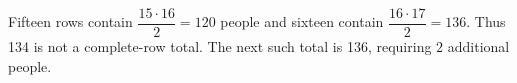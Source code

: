 Fifteen rows contain $\dfrac{15\cdot16}{2}=120$ people and sixteen contain $\dfrac{16\cdot17}{2}=136$. Thus 134 is not a complete-row total. The next such total is 136, requiring $\boxed2$ additional people.

